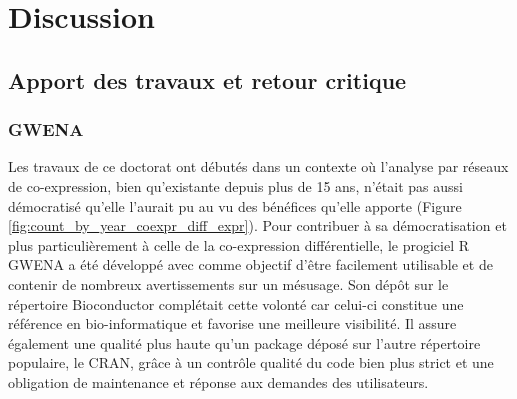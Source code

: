 \setcounter{chapter}{5}
\setcounter{section}{0}
\setcounter{figure}{0}   
\chapter*{Discussion}         %

\section{Apport des travaux et retour critique}

\subsection{GWENA}

Les travaux de ce doctorat ont débutés dans un contexte où l'analyse par réseaux de co-expression, bien qu'existante depuis plus de 15 ans, n'était pas aussi démocratisé qu'elle l'aurait pu au vu des bénéfices qu'elle apporte (Figure \ref{fig:count_by_year_coexpr_diff_expr}). Pour contribuer à sa démocratisation et plus particulièrement à celle de la co-expression différentielle, le progiciel R GWENA a été développé avec comme objectif d'être facilement utilisable et de contenir de nombreux avertissements sur un mésusage. Son dépôt sur le répertoire Bioconductor complétait cette volonté car celui-ci constitue une référence en bio-informatique et favorise une meilleure visibilité. Il assure également une qualité plus haute qu'un package déposé sur l'autre répertoire populaire, le CRAN, grâce à un contrôle qualité du code bien plus strict et une obligation de maintenance et réponse aux demandes des utilisateurs.

